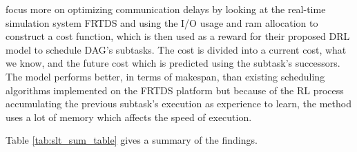 \citet{GuanFRTDS2020RL} focus more on optimizing
communication delays by looking 
at the real-time simulation system FRTDS
and using the I/O usage and ram allocation to construct a cost 
function, which is then used as a reward for their proposed
DRL model to schedule DAG's subtasks.
The cost is divided into a current cost, what we know,
and the future cost which is predicted using the subtask's successors.
The model performs better, in terms of makespan, than 
existing scheduling algorithms implemented on the FRTDS platform 
but because of the RL process accumulating the previous subtask's
execution as experience to learn, the method uses a lot of memory
which affects the speed of execution.



Table \ref{tab:slt_sum_table} gives a summary of the findings.

